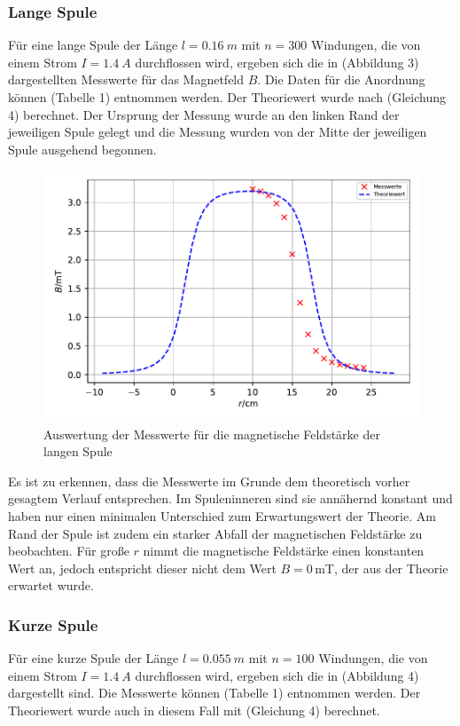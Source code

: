 \documentclass[
  bibliography=totoc,     %
  captions=tableheading,  %
  titlepage=firstiscover, %
]{scrartcl}
\begin{document}
  \subsubsection{Lange Spule}
  Für eine lange Spule der Länge $l=\SI{0,16}{m}$ mit $n=300$ Windungen, die von einem Strom $I=\SI{1,4}{A}$ durchflossen wird,
  ergeben sich die in (Abbildung 3) dargestellten Messwerte für das Magnetfeld $B$. Die Daten für die Anordnung
  können (Tabelle 1) entnommen werden. Der Theoriewert wurde nach (Gleichung 4) berechnet.
  Der Ursprung der Messung wurde an den linken Rand der jeweiligen Spule gelegt und die Messung wurden von der Mitte der jeweiligen
  Spule ausgehend begonnen.

  \begin{figure}
    \centering
    \includegraphics{lange_spule.pdf}
    \caption{Auswertung der Messwerte für die magnetische Feldstärke der langen Spule}
    \label{fig:lange_spule}
  \end{figure}
  \FloatBarrier
  
  Es ist zu erkennen, dass die Messwerte im Grunde dem theoretisch vorher gesagtem Verlauf entsprechen.
  Im Spuleninneren sind sie annähernd konstant und haben nur einen minimalen Unterschied zum Erwartungswert der Theorie.
  Am Rand der Spule ist zudem ein starker Abfall der magnetischen Feldstärke zu beobachten. Für große $r$ nimmt die
  magnetische Feldstärke einen konstanten Wert an, jedoch entspricht dieser nicht dem Wert $B=0$\,mT, 
  der aus der Theorie erwartet wurde.

  \subsubsection{Kurze Spule}
  Für eine kurze Spule der Länge $l=\SI{0.055}{m}$ mit $n=100$ Windungen, die von einem Strom $I=\SI{1,4}{A}$ durchflossen wird,
  ergeben sich die in (Abbildung 4) dargestellt sind. Die Messwerte können (Tabelle 1) entnommen werden.
  Der Theoriewert wurde auch in diesem Fall mit (Gleichung 4) berechnet.
\end{document}
